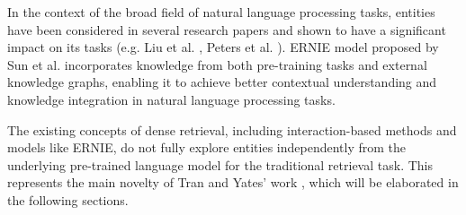 In the context of the broad field of natural language processing tasks, entities have been considered in several research papers and shown to have a significant impact on its tasks (e.g. Liu et al. \cite{liu2020k}, Peters et al. \cite{peters2019knowledge}). ERNIE model proposed by Sun et al. \cite{ernie} incorporates knowledge from both pre-training tasks and external knowledge graphs, enabling it to achieve better contextual understanding and knowledge integration in natural language processing tasks. 

\begin{comment}
    ERNIE builds upon BERT's methods, particularly the masked language model, and tailors them to a more context-sensitive learning approach. ERNIE employs a masking strategy during its learning procedure, where the model is required to predict not only single words or tokens, but also several consecutive words. These consecutive words originate from different subtasks within the ERNIE model, including basic-level masking, phrase-level masking, and entity-level masking. The basic-level masking follows the standard token masking approach used in BERT, while the phrase-level masking groups small sets of tokens together to form conceptual units in the language to learn. Of most relevance to this seminar report is the entity-level masking stage, where the model tries to accurately predict entities that can span multiple tokens. This leads to the model becoming highly sensitive towards entities, as demonstrated by Sun et al. in their work on ERNIE \cite{ernie}. ERNIE can be fine-tuned for information retrieval tasks, offering valuable insights and serving as a reference model for Tran and Yates' work \cite{tran2022dense}.
\end{comment}

The existing concepts of dense retrieval, including interaction-based methods and models like ERNIE, do not fully explore entities independently from the underlying pre-trained language model for the traditional retrieval task. This represents the main novelty of Tran and Yates' work \cite{tran2022dense}, which will be elaborated in the following sections.



